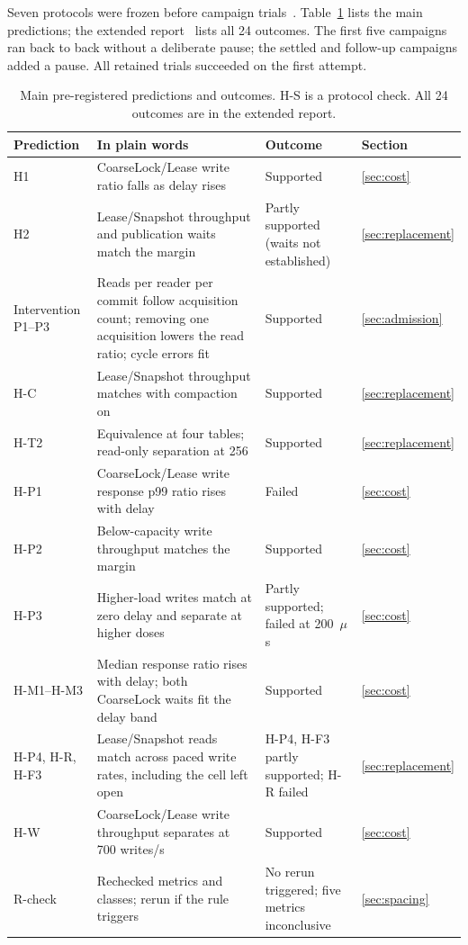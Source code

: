 \documentclass[conference]{IEEEtran}
\begin{document}
Seven protocols were frozen before campaign trials~\cite{nosek2018}. Table~\ref{tab:prereg} lists the main predictions; the extended report~\cite{extended} lists all 24 outcomes. The first five campaigns ran back to back without a deliberate pause; the settled and follow-up campaigns added a pause. All \FollowTotalTrials{} retained trials succeeded on the first attempt.
\begin{table}[t]
\caption{Main pre-registered predictions and outcomes. H-S is a protocol check. All 24 outcomes are in the extended report.}
\label{tab:prereg}\centering\scriptsize\setlength{\tabcolsep}{3pt}
\begin{tabular}{lp{}ll}\toprule
Prediction & In plain words & Outcome & Section\\\midrule
H1 & CoarseLock/Lease write ratio falls as delay rises & Supported & \ref{sec:cost}\\
H2 & Lease/Snapshot throughput and publication waits match the margin & Partly supported (waits not established) & \ref{sec:replacement}\\
Intervention P1--P3 & Reads per reader per commit follow acquisition count; removing one acquisition lowers the read ratio; cycle errors fit & Supported & \ref{sec:admission}\\
H-C & Lease/Snapshot throughput matches with compaction on & Supported & \ref{sec:replacement}\\
H-T2 & Equivalence at four tables; read-only separation at 256 & Supported & \ref{sec:replacement}\\
H-P1 & CoarseLock/Lease write response p99 ratio rises with delay & Failed & \ref{sec:cost}\\
H-P2 & Below-capacity write throughput matches the margin & Supported & \ref{sec:cost}\\
H-P3 & Higher-load writes match at zero delay and separate at higher doses & Partly supported; failed at 200~$\mu$s & \ref{sec:cost}\\
H-M1--H-M3 & Median response ratio rises with delay; both CoarseLock waits fit the delay band & Supported & \ref{sec:cost}\\
H-P4, H-R, H-F3 & Lease/Snapshot reads match across paced write rates, including the cell left open & H-P4, H-F3 partly supported; H-R failed & \ref{sec:replacement}\\
H-W & CoarseLock/Lease write throughput separates at 700 writes/s & Supported & \ref{sec:cost}\\
R-check & Rechecked metrics and classes; rerun if the rule triggers & No rerun triggered; five metrics inconclusive & \ref{sec:spacing}\\

\end{tabular}
\end{table}
\end{document}
